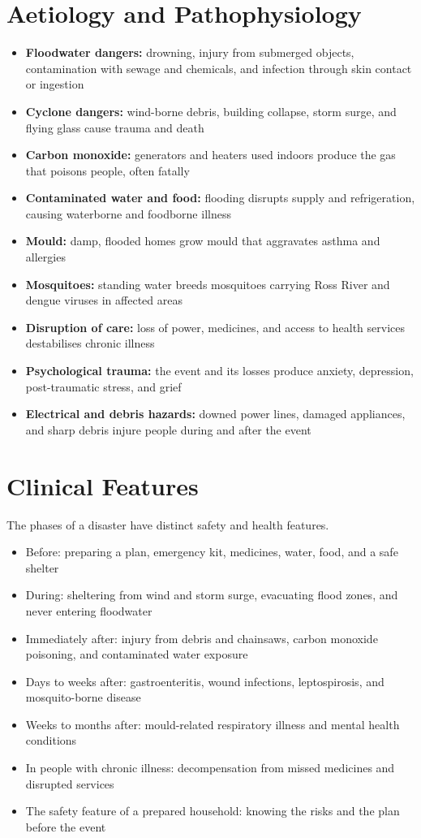 \section*{Aetiology and Pathophysiology}
\begin{itemize}
    \item \textbf{Floodwater dangers:} drowning, injury from submerged objects, contamination with sewage and chemicals, and infection through skin contact or ingestion
    \item \textbf{Cyclone dangers:} wind-borne debris, building collapse, storm surge, and flying glass cause trauma and death
    \item \textbf{Carbon monoxide:} generators and heaters used indoors produce the gas that poisons people, often fatally
    \item \textbf{Contaminated water and food:} flooding disrupts supply and refrigeration, causing waterborne and foodborne illness
    \item \textbf{Mould:} damp, flooded homes grow mould that aggravates asthma and allergies
    \item \textbf{Mosquitoes:} standing water breeds mosquitoes carrying Ross River and dengue viruses in affected areas
    \item \textbf{Disruption of care:} loss of power, medicines, and access to health services destabilises chronic illness
    \item \textbf{Psychological trauma:} the event and its losses produce anxiety, depression, post-traumatic stress, and grief
    \item \textbf{Electrical and debris hazards:} downed power lines, damaged appliances, and sharp debris injure people during and after the event
\end{itemize}

\section*{Clinical Features}
The phases of a disaster have distinct safety and health features.
\begin{itemize}
    \item Before: preparing a plan, emergency kit, medicines, water, food, and a safe shelter
    \item During: sheltering from wind and storm surge, evacuating flood zones, and never entering floodwater
    \item Immediately after: injury from debris and chainsaws, carbon monoxide poisoning, and contaminated water exposure
    \item Days to weeks after: gastroenteritis, wound infections, leptospirosis, and mosquito-borne disease
    \item Weeks to months after: mould-related respiratory illness and mental health conditions
    \item In people with chronic illness: decompensation from missed medicines and disrupted services
    \item The safety feature of a prepared household: knowing the risks and the plan before the event
\end{itemize}

